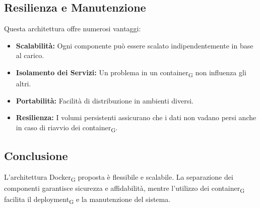 \subsection{Resilienza e Manutenzione}

Questa architettura offre numerosi vantaggi:
\begin{itemize}
    \item \textbf{Scalabilità:} Ogni componente può essere scalato indipendentemente in base al carico.
    \item \textbf{Isolamento dei Servizi:} Un problema in un container\textsubscript{G} non influenza gli altri.
    \item \textbf{Portabilità:} Facilità di distribuzione in ambienti diversi.
    \item \textbf{Resilienza:} I volumi persistenti assicurano che i dati non vadano persi anche in caso di riavvio dei container\textsubscript{G}.
\end{itemize}

\subsection{Conclusione}

L'architettura Docker\textsubscript{G} proposta è flessibile e scalabile. La separazione dei componenti garantisce sicurezza e affidabilità, mentre l'utilizzo dei container\textsubscript{G} facilita il deployment\textsubscript{G} e la manutenzione del sistema.